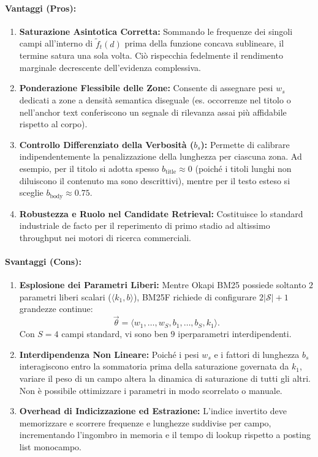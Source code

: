 \paragraph{Vantaggi (Pros):}
\begin{enumerate}
    \item \textbf{Saturazione Asintotica Corretta:} Sommando le frequenze dei singoli campi all'interno di $\tilde{f}_t(d)$ prima della funzione concava sublineare, il termine satura una sola volta. Ci\`o rispecchia fedelmente il rendimento marginale decrescente dell'evidenza complessiva.
    \item \textbf{Ponderazione Flessibile delle Zone:} Consente di assegnare pesi $w_s$ dedicati a zone a densit\`a semantica diseguale (es. occorrenze nel titolo o nell'anchor text conferiscono un segnale di rilevanza assai pi\`u affidabile rispetto al corpo).
    \item \textbf{Controllo Differenziato della Verbosit\`a ($b_s$):} Permette di calibrare indipendentemente la penalizzazione della lunghezza per ciascuna zona. Ad esempio, per il titolo si adotta spesso $b_{\text{title}} \approx 0$ (poich\'e i titoli lunghi non diluiscono il contenuto ma sono descrittivi), mentre per il testo esteso si sceglie $b_{\text{body}} \approx 0.75$.
    \item \textbf{Robustezza e Ruolo nel Candidate Retrieval:} Costituisce lo standard industriale de facto per il reperimento di primo stadio ad altissimo throughput nei motori di ricerca commerciali.
\end{enumerate}

\paragraph{Svantaggi (Cons):}
\begin{enumerate}
    \item \textbf{Esplosione dei Parametri Liberi:} Mentre Okapi BM25 possiede soltanto $2$ parametri liberi scalari ($\langle k_1, b \rangle$), BM25F richiede di configurare $2|\mathcal{S}| + 1$ grandezze continue:
    \begin{equation}
    \vec{\theta} = \langle w_1, \dots, w_S, b_1, \dots, b_S, k_1 \rangle.
    \end{equation}
    Con $S=4$ campi standard, vi sono ben $9$ iperparametri interdipendenti.
    \item \textbf{Interdipendenza Non Lineare:} Poich\'e i pesi $w_s$ e i fattori di lunghezza $b_s$ interagiscono entro la sommatoria prima della saturazione governata da $k_1$, variare il peso di un campo altera la dinamica di saturazione di tutti gli altri. Non \`e possibile ottimizzare i parametri in modo scorrelato o manuale.
    \item \textbf{Overhead di Indicizzazione ed Estrazione:} L'indice invertito deve memorizzare e scorrere frequenze e lunghezze suddivise per campo, incrementando l'ingombro in memoria e il tempo di lookup rispetto a posting list monocampo.
\end{enumerate}

